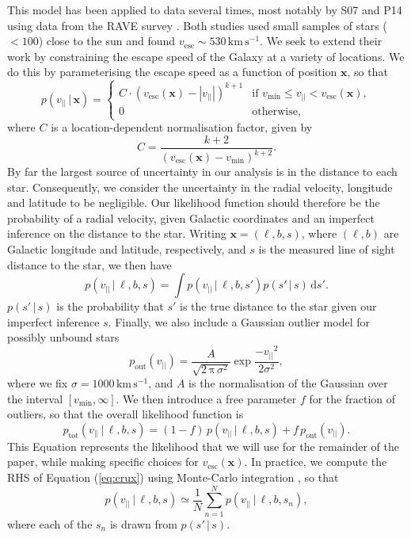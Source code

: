 \documentclass[useAMS,twocolumn,usenatbib]{mn2e}
\def\kms{{\,\mathrm{km\,s^{-1}}}}
\def\vlos{{v_{||}}}
\def\vesc{{v_\mathrm{esc}}}
\def\vmin{{v_\mathrm{min}}}
\def\pos{{\boldsymbol{x}}}
\def\intd{{\mathrm{d}}}
\begin{document}
This model has been applied to data several times, most notably by S07 and P14 using data from the {\sc RAVE} survey \citep{Ko13}. 
Both studies used small samples of stars ($<100$) close to the sun and found $\vesc \sim 530\kms$. 
We seek to extend their work by constraining the escape speed of the Galaxy at a variety of locations. 
We do this by parameterising the escape speed as a function of position $\pos$, so that
%
\begin{equation}
  p(\vlos \,|\, \pos) = \begin{cases}
    C\cdot(\vesc(\pos) - |\vlos|)^{k+1} & \text{if $\vmin \leq \vlos <\vesc(\pos)$},\\
    0 & \text{otherwise},
  \end{cases}
  \label{eq:model}
\end{equation}
%
where $C$ is a location-dependent normalisation factor, given by
%
\begin{equation}
C = \dfrac{k+2}{(\vesc(\pos) - \vmin)^{k+2}}.
\label{eq:norm}
\end{equation}
%
By far the largest source of uncertainty in our analysis is in the distance to each star. 
Consequently, we consider the uncertainty in the radial velocity, longitude and latitude to be negligible. 
Our likelihood function should therefore be the probability of a radial velocity, given Galactic coordinates and an imperfect inference on the distance to the star. 
Writing $\pos = (\ell, b, s)$, where $(\ell,b)$ are Galactic longitude and latitude, respectively, and $s$ is the measured line of sight distance to the star, we then have
%
\begin{equation}
p(\vlos \,|\, \ell, b, s) = \int p(\vlos \,| \,\ell, b, s' )p(s'\,|\,s)\, \intd s'.
\label{eq:crux}
\end{equation}
%
$p(s'\,|\,s)$ is the probability that $s'$ is the true distance to the star given our imperfect inference $s$. 
Finally, we also include a Gaussian outlier model for possibly unbound stars
%
\begin{equation}
p_\mathrm{out}(\vlos) = \dfrac{A}{\sqrt{2\,\mathrm{\pi}\,\sigma^2}}\exp \dfrac{-\vlos^2}{2\sigma^2},
\end{equation}
%
where we fix $\sigma = 1000\kms$, and $A$ is the normalisation of the Gaussian over the interval $\left[v_\mathrm{min},\infty\right]$. 
We then introduce a free parameter $f$ for the fraction of outliers, so that the overall likelihood function is
%
\begin{equation}
p_\mathrm{tot}(\vlos \,|\, \ell, b, s) = (1-f)\,p(\vlos \,|\, \ell, b, s) + f\,p_\mathrm{out}(\vlos).
\end{equation}
%
This Equation represents the likelihood that we will use for the remainder of the paper, while making specific choices for $\vesc(\pos)$. 
In practice, we compute the RHS of Equation (\ref{eq:crux}) using Monte-Carlo integration \citep[e.g.][]{Ev16,Bo16}, so that
%
\begin{equation}
p(\vlos \,|\, \ell, b, s) \simeq \dfrac{1}{N}\sum\limits_{n=1}^{N} p(\vlos \,| \,\ell, b, s_n ),
\end{equation}
%
where each of the $s_n$ is drawn from $p(s'\,|\,s)$.
\end{document}
